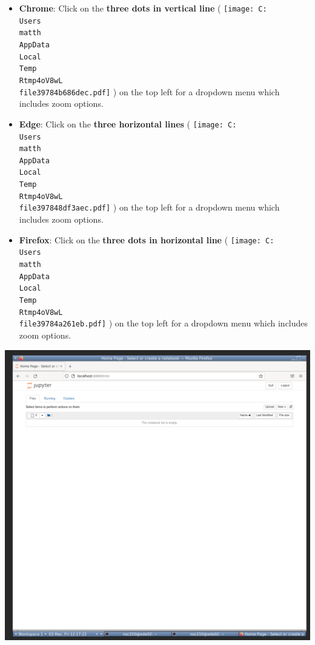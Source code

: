 \documentclass[
]{book}
\providecommand{\tightlist}{%
  \setlength{\itemsep}{0pt}\setlength{\parskip}{0pt}}
\begin{document}
\begin{itemize}
\tightlist
\item
  \textbf{Chrome}: Click on the \textbf{three dots in vertical line} (
  \protect\texttt{[image: C:\\Users\\matth\\AppData\\Local\\Temp\\Rtmp4oV8wL\\file39784b686dec.pdf]}
  ) on the top left for a dropdown menu which includes zoom options.
\item
  \textbf{Edge}: Click on the \textbf{three horizontal lines} (
  \protect\texttt{[image: C:\\Users\\matth\\AppData\\Local\\Temp\\Rtmp4oV8wL\\file397848df3aec.pdf]}
  ) on the top left for a dropdown menu which includes zoom options.
\item
  \textbf{Firefox}: Click on the \textbf{three dots in horizontal line} (
  \protect\texttt{[image: C:\\Users\\matth\\AppData\\Local\\Temp\\Rtmp4oV8wL\\file39784a261eb.pdf]}
  ) on the top left for a dropdown menu which includes zoom options.
\end{itemize}

\includegraphics{figures/jupyter_notebook_example_1.png}
\end{document}
